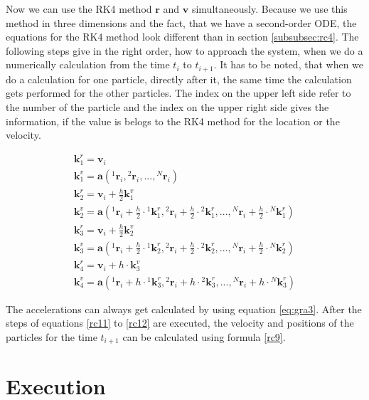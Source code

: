 \documentclass[10pt,a4paper]{article}
\begin{document}
Now we can use the RK4 method $\mathbf{r}$ and $\mathbf{v}$ simultaneously. Because we use this method in three dimensions and the fact, that we have a second-order ODE, the equations for the RK4 method look different than in section \ref{subsubsec:rc4}. The following steps give in the right order, how to approach the system, when we do a numerically calculation from the time $t_i$ to $t_{i+1}$. It has to be noted, that when we do a calculation for one particle, directly after it, the same time the calculation gets performed for the other particles. The index on the upper left side refer to the number of the particle and the index on the upper right side gives the information, if the value is belogs to the RK4 method for the location or the velocity.

\begin{align}
\label{rc11}
\mathbf{k}_1^r = \mathbf{v}_i \\
\mathbf{k}_{1}^{v} = \mathbf{a}({}^{1}\mathbf{r}_i, {}^{2}\mathbf{r}_i,..., {}^{N}\mathbf{r}_i) \\
\mathbf{k}_2^r = \mathbf{v}_i + \frac{h}{2} \mathbf{k}_1^{v}	\\
\mathbf{k}_2^{v} = \mathbf{a}({}^{1}\mathbf{r}_i + \frac{h}{2}\cdot {}^{1}\mathbf{k}_1^r, {}^{2}\mathbf{r}_i + \frac{h}{2}\cdot {}^{2}\mathbf{k}_1^r,..., {}^{N}\mathbf{r}_i + \frac{h}{2}\cdot {}^{N}\mathbf{k}_1^r)	\\
\mathbf{k}_3^r = \mathbf{v}_i + \frac{h}{2} \mathbf{k}_2^v	\\
\mathbf{k}_3^{v} = \mathbf{a}({}^{1}\mathbf{r}_i + \frac{h}{2}\cdot {}^{1}\mathbf{k}_2^r, {}^{2}\mathbf{r}_i + \frac{h}{2}\cdot {}^{2}\mathbf{k}_2^r,..., {}^{N}\mathbf{r}_i + \frac{h}{2}\cdot {}^{N}\mathbf{k}_2^r)	\\
\mathbf{k}_4^r = \mathbf{v}_i + h \cdot \mathbf{k}_3^v	\\
\label{rc12}
\mathbf{k}_4^{v} = \mathbf{a}({}^{1}\mathbf{r}_i + h\cdot {}^{1}\mathbf{k}_3^r, {}^{2}\mathbf{r}_i + h\cdot {}^{2}\mathbf{k}_3^r,..., {}^{N}\mathbf{r}_i + h\cdot {}^{N}\mathbf{k}_3^r)
\end{align}

The accelerations can always get calculated by using equation \eqref{eq:gra3}. After the steps of equations \eqref{rc11} to \eqref{rc12} are executed, the velocity and positions of the particles for the time $t_{i+1}$ can be calculated using formula \eqref{rc9}.

\section{Execution}
\end{document}
